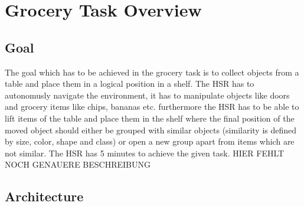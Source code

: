 \documentclass[main.tex]{subfiles}
\begin{document}
	
	\begingroup
	
	\renewcommand{\cleardoublepage}{}
	
	\renewcommand{\clearpage}{}
	
	\chapter{Grocery Task Overview}
	
	
	\chapterauthor{}
	
	\section{Goal}

	The goal which has to be achieved in the grocery task is to collect objects from a table and place them in a logical position in a shelf. The HSR has to autonomusly navigate the environment, it has to manipulate objects like doors and grocery items like chips, bananas etc. furthermore the HSR has to be able to lift items of the table and place them in the shelf where the final position of the moved object should either be grouped with similar objects (similarity is defined by size, color, shape and class) or open a new group apart from items which are not similar. The HSR has 5 minutes to achieve the given task. HIER FEHLT NOCH GENAUERE BESCHREIBUNG
	
	\section{Architecture}
	
\end{document}
